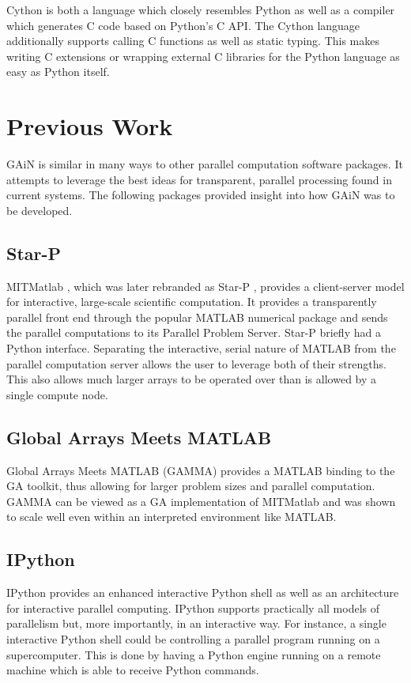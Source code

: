 \documentclass{sigplanconf}
\begin{document}
Cython \cite{Beh11} is both a language which closely resembles Python as well
as a compiler which generates C code based on Python's C API. The Cython
language additionally supports calling C functions as well as static typing.
This makes writing C extensions or wrapping external C libraries for the
Python language as easy as Python itself.

\section{Previous Work}

GAiN is similar in many ways to other parallel computation software packages.
It attempts to leverage the best ideas for transparent, parallel processing
found in current systems. The following packages provided insight into how
GAiN was to be developed.

\subsection{Star-P}

MITMatlab \cite{Hus98}, which was later rebranded as Star-P \cite{Ede07},
provides a client-server model for interactive, large-scale scientific
computation. It provides a transparently parallel front end through the
popular MATLAB \cite{Pal07} numerical package and sends the parallel
computations to its Parallel Problem Server. Star-P briefly had a Python
interface. Separating the interactive, serial nature of MATLAB from the
parallel computation server allows the user to leverage both of their
strengths. This also allows much larger arrays to be operated over than is
allowed by a single compute node.

\subsection{Global Arrays Meets MATLAB}

Global Arrays Meets MATLAB (GAMMA) \cite{Pan06} provides a MATLAB binding to
the GA toolkit, thus allowing for larger problem sizes and parallel
computation.  GAMMA can be viewed as a GA implementation of MITMatlab and was
shown to scale well even within an interpreted environment like MATLAB.

\subsection{IPython}

IPython \cite{Per07} provides an enhanced interactive Python shell as well as
an architecture for interactive parallel computing. IPython supports
practically all models of parallelism but, more importantly, in an interactive
way. For instance, a single interactive Python shell could be controlling a
parallel program running on a supercomputer. This is done by having a Python
engine running on a remote machine which is able to receive Python commands.
\end{document}
